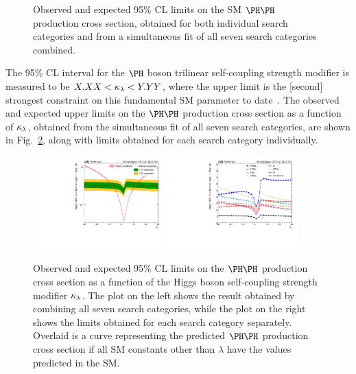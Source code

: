 \begin{figure}
  \centering
  \caption{
    Observed and expected 95\% CL limits on the SM $\HH$ production cross section,
    obtained for both individual search categories
    and from a simultaneous fit of all seven search categories combined.
  }
  \label{fig:HH_limits_SM}
\end{figure}

The 95\% CL interval for the $\PHiggs$ boson trilinear self-coupling strength modifier
is measured to be $X.XX < \kappa_{\lambda} < Y.YY$, where the upper limit is the [second]
strongest constraint on this fundamental SM parameter to date~\cite{Sirunyan:2745738,Sirunyan:2018ayu,2020135103}.
The observed and expected upper limits on the $\HH$ production cross section as a function of
$\kappa_{\lambda}$, obtained from the simultaneous fit of all seven search categories, are shown in Fig.~\ref{fig:HH_limits_kLambda}, 
along with limits obtained for each search category individually.

\begin{figure}
  \centering
  \includegraphics[width=0.45\textwidth]{figures/klscan.pdf}
  \hspace{0.05\textwidth}
  \includegraphics[width=0.45\textwidth]{figures/klMultiscan.pdf}
  \caption{
    Observed and expected 95\% CL limits on the $\HH$ production cross section as
    a function of the Higgs boson self-coupling strength modifier $\kappa_{\lambda}$.
    The plot on the left shows the result obtained by combining all seven search categories,
    while the plot on the right shows the limits obtained for each search category separately.  Overlaid is a curve representing the
    predicted $\HH$ production cross section if all SM constants other than
    $\lambda$ have the values predicted in the SM.
  }
  \label{fig:HH_limits_kLambda}
\end{figure}

